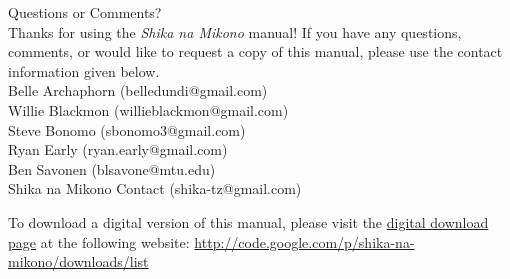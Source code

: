 \begin{center}
{\Huge Questions or Comments?}\\[12pt]
Thanks for using the \textit{Shika na Mikono} manual! If you have any questions, comments, or would like to request a copy of this manual, please use the contact information given below.\\[20pt]
Belle Archaphorn (belledundi@gmail.com)\\
Willie Blackmon (willieblackmon@gmail.com)\\
Steve Bonomo (sbonomo3@gmail.com)\\
Ryan Early (ryan.early@gmail.com)\\
Ben Savonen (blsavone@mtu.edu)\\
Shika na Mikono Contact (shika-tz@gmail.com)
\end{center}
\vfill
To download a digital version of this manual, please visit the \href{http://code.google.com/p/shika-na-mikono/downloads/list}{digital download page} at the following website: \url{http://code.google.com/p/shika-na-mikono/downloads/list}